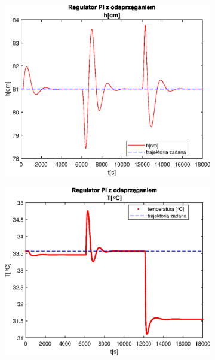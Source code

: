 \begin{figure}[h!]
   \centering
   \begin{subfigure}[b]{0.4\textwidth}
      \includegraphics[width=1\linewidth]{img/PI/decoupler/disturbance/PIDecouplerH3DisttrueLinfalse.eps}
      \caption{}
      \label{fig:fig:PIDecoupler3DisttrueLinfalse1}
   \end{subfigure}
       
   \begin{subfigure}[b]{0.4\textwidth}
      \includegraphics[width=1\linewidth]{img/PI/decoupler/disturbance/PIDecouplerT3DisttrueLinfalse.eps}
      \caption{}
      \label{fig:fig:PIDecoupler3DisttrueLinfalse2}
   \end{subfigure}
       

\end{figure}
